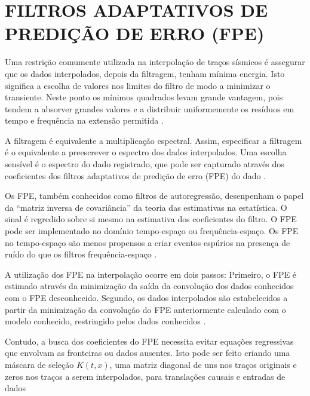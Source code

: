 %
% 
% 
% 
% 
% 
% 

\chapter{FILTROS ADAPTATIVOS DE PREDIÇÃO DE ERRO (FPE)}
\label{cap4}

Uma restrição comumente utilizada na interpolação de traços sísmicos
é assegurar que os dados interpolados, depois da filtragem,
tenham mínima energia. Isto significa a escolha de valores
nos limites do filtro de modo a minimizar o transiente. Neste ponto os mínimos
quadrados levam grande vantagem, pois tendem a absorver grandes valores e a distribuir
uniformemente os resíduos em tempo e frequência na extensão permitida \cite{claerbout92}.

A filtragem é equivalente a multiplicação espectral. Assim, especificar a filtragem
é o equivalente a preescrever o espectro dos dados interpolados. Uma escolha sensível
é o espectro do dado registrado, que pode ser capturado através dos coeficientes dos
filtros adaptativos de predição de erro (FPE) do dado \cite{spitz}. 

Os FPE, também conhecidos como filtros de autoregressão, desenpenham o
papel da ``matriz inversa de covariância'' da teoria das estimativas na estatística.
O sinal é regredido sobre si mesmo na estimativa dos coeficientes do filtro. O FPE
pode ser implementado no domínio tempo-espaço ou frequência-espaço. Os FPE no tempo-espaço
são menos propensos a criar eventos espúrios na presença de ruído do que os filtros
frequência-espaço \cite{abma}. 

A utilização dos FPE na interpolação ocorre em dois passos:
Primeiro, o FPE é estimado através da minimização da saída da convolução
dos dados conhecidos com o FPE desconhecido. Segundo, os dados interpolados
são estabelecidos a partir da minimização da convolução do FPE anteriormente 
calculado com o modelo conhecido, restringido pelos dados conhecidos \cite{curry}.

Contudo, a busca dos coeficientes do FPE necessita evitar equações regressivas que 
envolvam as fronteiras ou dados ausentes. Isto pode ser feito
criando uma máscara de seleção $K(t,x)$, uma matriz 
diagonal de uns nos traços originais e zeros nos traços a serem interpolados, 
para translações causais e entradas de dados \cite{claerbout10}

